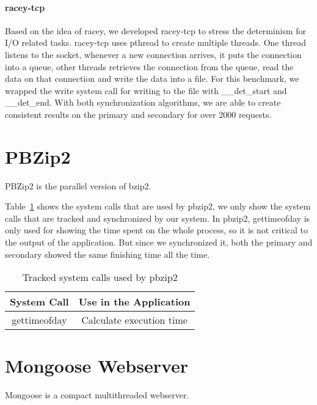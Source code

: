 \paragraph{racey-tcp} Based on the idea of racey, we developed racey-tcp to stress the determinism for I/O related tasks. racey-tcp uses pthread to create multiple threads. One thread listens to the socket, whenever a new connection arrives, it puts the connection into a queue, other threads retrieves the connection from the queue, read the data on that connection and write the data into a file. For this benchmark, we wrapped the write system call for writing to the file with \_\_det\_start and \_\_det\_end. With both synchronization algorithms, we are able to create consistent results on the primary and secondary for over 2000 requests.

\section{PBZip2}
PBZip2 is the parallel version of bzip2.

Table~\ref{t:pbzip2_syscall} shows the system calls that are used by pbzip2, we only show the system calls that are tracked and synchronized by our system. In pbzip2,  gettimeofday is only used for showing the time spent on the whole process, so it is not critical to the output of the application. But since we synchronized it, both the primary and secondary showed the same finishing time all the time.

\begin{table}
 \caption{Tracked system calls used by pbzip2}
\begin{center}
 \begin{tabular}{c | c}
 System Call & Use in the Application\\ \hline
 gettimeofday & Calculate execution time
 \end{tabular}
\end{center}
\label{t:pbzip2_syscall}
\end{table}

\section{Mongoose Webserver}

Mongoose is a compact multithreaded webserver.

